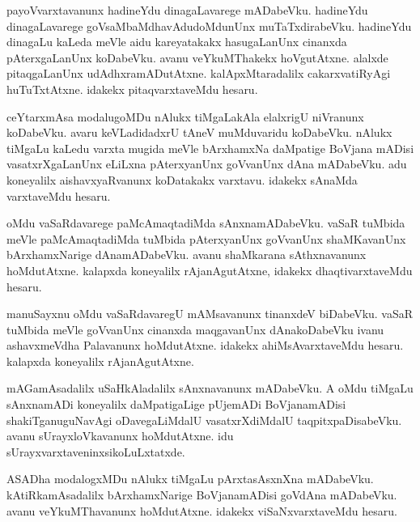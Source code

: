 \documentclass{article}
\begin{document}
\begin{mn}
payoVvarxtavanunx  hadineYdu  dinagaLavarege  mADabeVku.  hadineYdu  dinagaLavarege  
goVsaMbaMdhavAdudoMdunUnx  muTaTxdirabeVku.  hadineYdu  dinagaLu  kaLeda meVle  
aidu  kareyatakakx  hasugaLanUnx  cinanxda  pAterxgaLanUnx  koDabeVku.  avanu  
veYkuMThakekx  hoVgutAtxne.  alalxde  pitaqgaLanUnx  udAdhxramADutAtxne.  
kalApxMtaradalilx  cakarxvatiRyAgi  huTuTxtAtxne.  idakekx  pitaqvarxtaveMdu  hesaru.
\end{mn}

\begin{mn}
ceYtarxmAsa  modalugoMDu  nAlukx  tiMgaLakAla  elalxrigU  niVranunx  koDabeVku.  
avaru  keVLadidadxrU  tAneV  muMduvaridu  koDabeVku.  nAlukx  tiMgaLu  kaLedu  
varxta  mugida  meVle  bArxhamxNa daMpatige  BoVjana  mADisi  vasatxrXgaLanUnx  
eLiLxna  pAterxyanUnx  goVvanUnx  dAna  mADabeVku.  adu  koneyalilx  
aishavxyaRvanunx  koDatakakx  varxtavu.  idakekx  sAnaMda varxtaveMdu  hesaru.
\end{mn}

\begin{mn}
oMdu  vaSaRdavarege  paMcAmaqtadiMda  sAnxnamADabeVku.  vaSaR  tuMbida  meVle  
paMcAmaqtadiMda  tuMbida  pAterxyanUnx  goVvanUnx  shaMKavanUnx  bArxhamxNarige  
dAnamADabeVku.  avanu  shaMkarana  sAthxnavanunx  hoMdutAtxne.  kalapxda  
koneyalilx  rAjanAgutAtxne,  idakekx  dhaqtivarxtaveMdu  hesaru.
\end{mn}

\begin{mn}
manuSayxnu   oMdu  vaSaRdavaregU  mAMsavanunx  tinanxdeV  biDabeVku.  vaSaR  tuMbida  
meVle  goVvanUnx  cinanxda  maqgavanUnx  dAnakoDabeVku  ivanu  ashavxmeVdha Palavanunx  
hoMdutAtxne.  idakekx  ahiMsAvarxtaveMdu  hesaru.  kalapxda  koneyalilx  rAjanAgutAtxne.
\end{mn}

\begin{mn}
mAGamAsadalilx  uSaHkAladalilx  sAnxnavanunx  mADabeVku.  A  oMdu  tiMgaLu  sAnxnamADi  koneyalilx  
daMpatigaLige  pUjemADi  BoVjanamADisi  shakiTganuguNavAgi  oDavegaLiMdalU  vasatxrXdiMdalU  
taqpitxpaDisabeVku.  avanu  sUrayxloVkavanunx  hoMdutAtxne.  idu  sUrayxvarxtaveninxsikoLuLxtatxde.
\end{mn}

\begin{mn}
ASADha  modalogxMDu  nAlukx  tiMgaLu  pArxtasAsxnXna mADabeVku.  kAtiRkamAsadalilx  
bArxhamxNarige  BoVjanamADisi  goVdAna mADabeVku.  avanu  veYkuMThavanunx  
hoMdutAtxne.  idakekx  viSaNxvarxtaveMdu  hesaru.
\end{mn}
\end{document}
